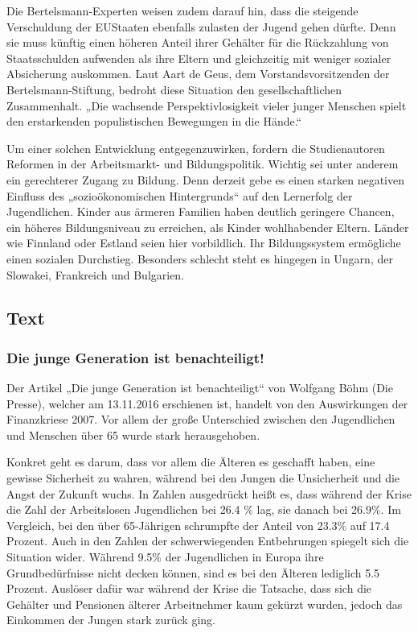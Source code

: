Die Bertelsmann-Experten weisen zudem darauf hin, dass die steigende Verschuldung der EUStaaten ebenfalls zulasten der Jugend gehen dürfte. Denn sie muss künftig einen höheren Anteil
ihrer Gehälter für die Rückzahlung von Staatsschulden aufwenden als ihre Eltern und
gleichzeitig mit weniger sozialer Absicherung auskommen. Laut Aart de Geus, dem
Vorstandsvorsitzenden der Bertelsmann-Stiftung, bedroht diese Situation den
gesellschaftlichen Zusammenhalt. „Die wachsende Perspektivlosigkeit vieler junger Menschen
spielt den erstarkenden populistischen Bewegungen in die Hände.“

Um einer solchen Entwicklung entgegenzuwirken, fordern die Studienautoren Reformen in der
Arbeitsmarkt- und Bildungspolitik. Wichtig sei unter anderem ein gerechterer Zugang zu
Bildung. Denn derzeit gebe es einen starken negativen Einfluss des „sozioökonomischen
Hintergrunds“ auf den Lernerfolg der Jugendlichen. Kinder aus ärmeren Familien haben
deutlich geringere Chancen, ein höheres Bildungsniveau zu erreichen, als Kinder wohlhabender
Eltern. Länder wie Finnland oder Estland seien hier vorbildlich. Ihr Bildungssystem ermögliche
einen sozialen Durchstieg. Besonders schlecht steht es hingegen in Ungarn, der Slowakei,
Frankreich und Bulgarien.


\subsection{Text}
\subsubsection{Die junge Generation ist benachteiligt!}
Der Artikel „Die junge Generation ist benachteiligt“ von Wolfgang Böhm (Die Presse), welcher am 13.11.2016 erschienen ist, handelt von den Auswirkungen der Finanzkriese 2007. Vor allem der große Unterschied zwischen den Jugendlichen und Menschen über 65 wurde stark herausgehoben.  

Konkret geht es darum, dass vor allem die Älteren es geschafft haben, eine gewisse Sicherheit zu wahren, während bei den Jungen die Unsicherheit und die Angst der Zukunft wuchs. In Zahlen ausgedrückt heißt es, dass während der Krise die Zahl der Arbeitslosen Jugendlichen bei 26.4 \% lag, sie danach bei 26.9\%. Im Vergleich, bei den über 65-Jährigen schrumpfte der Anteil von 23.3\% auf 17.4 Prozent. Auch in den Zahlen der schwerwiegenden Entbehrungen spiegelt sich die Situation wider. Während 9.5\% der Jugendlichen in Europa ihre Grundbedürfnisse nicht decken können, sind es bei den Älteren lediglich 5.5 Prozent. Auslöser dafür war während der Krise die Tatsache, dass sich die Gehälter und Pensionen älterer Arbeitnehmer kaum gekürzt wurden, jedoch das Einkommen der Jungen stark zurück ging.   

